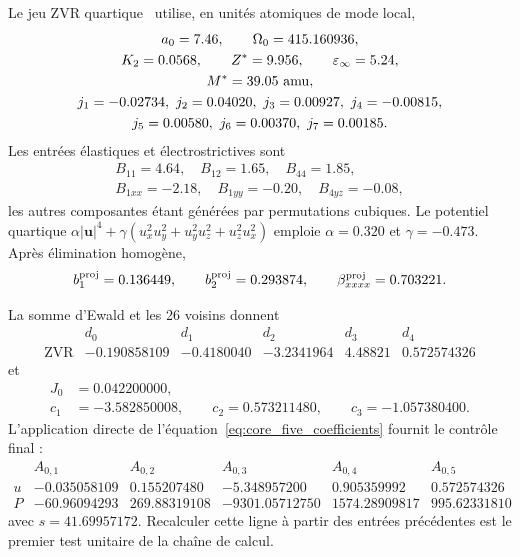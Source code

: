 Le jeu ZVR quartique~\cite{Zhong1995} utilise, en unités atomiques de mode
local,
\begin{equation}
\begin{gathered}
a_0=7.46,\qquad \Omega_0=415.160936,\\
K_2=0.0568,\qquad Z^*=9.956,\qquad
\varepsilon_\infty=5.24,\\
M^*=39.05\ {\rm amu},\\
j_1=-0.02734,\ j_2=0.04020,\ j_3=0.00927,\ j_4=-0.00815,\\
j_5=0.00580,\ j_6=0.00370,\ j_7=0.00185 .
\end{gathered}
\label{eq:core_zvr_input}
\end{equation}
Les entrées élastiques et électrostrictives sont
\begin{equation}
\begin{gathered}
B_{11}=4.64,\quad B_{12}=1.65,\quad B_{44}=1.85,\\
B_{1xx}=-2.18,\quad B_{1yy}=-0.20,\quad B_{4yz}=-0.08,
\end{gathered}
\label{eq:core_zvr_elastic_input}
\end{equation}
les autres composantes étant générées par permutations cubiques. Le potentiel
quartique
$\alpha|\mathbf u|^4+\gamma(u_x^2u_y^2+u_y^2u_z^2+u_z^2u_x^2)$
emploie $\alpha=0.320$ et $\gamma=-0.473$. Après élimination homogène,
\begin{equation}
b_1^{\rm proj}=0.136449,\qquad
b_2^{\rm proj}=0.293874,\qquad
\beta^{\rm proj}_{xxxx}=0.703221 .
\label{eq:core_zvr_quartic_projection}
\end{equation}

La somme d'Ewald et les 26 voisins donnent
\begin{equation}
\begin{array}{c|rrrrr}
&d_0&d_1&d_2&d_3&d_4\\ \hline
\mathrm{ZVR}
&-0.190858109&-0.4180040&-3.2341964&4.48821&0.572574326
\end{array}
\label{eq:core_zvr_dipolar_coeffs}
\end{equation}
et
\begin{equation}
\begin{aligned}
J_0&=0.042200000,\\
c_1&=-3.582850008,\qquad c_2=0.573211480,\qquad
c_3=-1.057380400.
\end{aligned}
\label{eq:core_zvr_sr_derived}
\end{equation}
L'application directe de
l'équation~\eqref{eq:core_five_coefficients} fournit le contrôle final :
\begingroup\small
\begin{equation}
\begin{array}{c|rrrrr}
&A_{0,1}&A_{0,2}&A_{0,3}&A_{0,4}&A_{0,5}\\ \hline
u&-0.035058109&0.155207480&-5.348957200&0.905359992&0.572574326\\
P&-60.96094293&269.88319108&-9301.05712750&1574.28909817&995.62331810
\end{array}
\label{eq:core_zvr_final_kernel}
\end{equation}
\endgroup
avec $s=41.69957172$. Recalculer cette ligne à partir des entrées précédentes
est le premier test unitaire de la chaîne de calcul.


